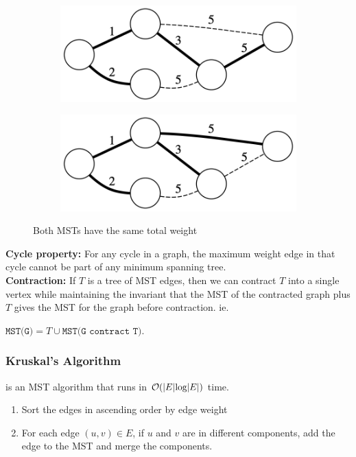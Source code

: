 \documentclass[a3paper, landscape, 11pt]{article} %
\begin{document}
\begin{multicols*}{4}
\begin{figure}[H]
\centering
  \begin{subfigure}[b]{0.49\columnwidth}
    \includegraphics[width=1\textwidth]{images/mst-uniqueness-1.png}
    \label{fig:image8}
  \end{subfigure}
  \begin{subfigure}[b]{0.49\columnwidth}
    \includegraphics[width=1\textwidth]{images/mst-uniqueness-2.png}
    \label{fig:image8}
  \end{subfigure}
  \caption*{Both MSTs have the same total weight}
\end{figure}



\textbf{Cycle property:} For any cycle in a graph, the maximum weight edge in that cycle cannot be part of any minimum spanning tree.\\

\textbf{Contraction:} If $T$ is a tree of MST edges, then we can contract $T$ into a single vertex while maintaining the invariant that the MST of the contracted graph plus $T$ gives the MST for the graph before contraction. ie. 

$\texttt{MST(G)} = T \cup  \texttt{MST(G contract T)}$.


\subsubsection*{Kruskal's Algorithm}
 is an MST algorithm that runs in $\mathcal{O}(|E| \text{log}|E|)$ time. 
\begin{enumerate}[noitemsep]
	\item Sort the edges in ascending order by edge weight
	\item For each edge $(u,v) \in E$, if $u$ and $v$ are in different components, add the edge to the MST and merge the components.
\end{enumerate}


\end{multicols*}
\end{document}
